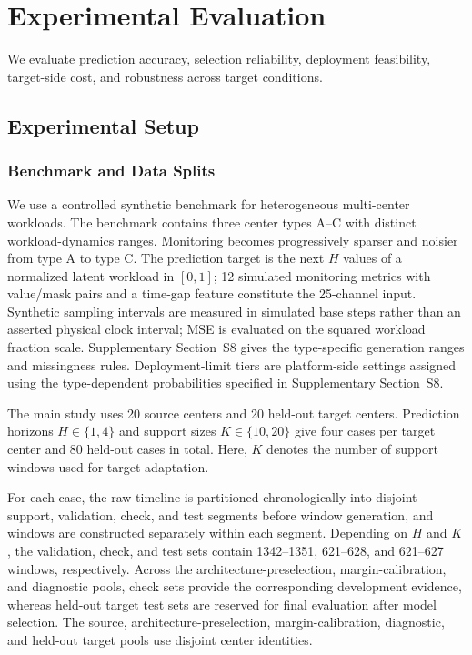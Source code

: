 \documentclass[a4paper,fleqn]{cas-sc}
\begin{document}
\section{Experimental Evaluation}
\label{sec:experiments}

We evaluate prediction accuracy, selection reliability, deployment
feasibility, target-side cost, and robustness across target conditions.

\subsection{Experimental Setup}
\label{subsec:experimental-setup}

\subsubsection{Benchmark and Data Splits}

We use a controlled synthetic benchmark for heterogeneous multi-center
workloads. The benchmark contains three center types A--C with distinct
workload-dynamics ranges. Monitoring becomes progressively sparser and noisier
from type A to type C. The prediction target is the next $H$ values of a
normalized latent workload in $[0,1]$; 12 simulated monitoring metrics
with value/mask pairs and a time-gap feature constitute the 25-channel input.
Synthetic sampling intervals are measured in simulated base steps rather than
an asserted physical clock interval; MSE is evaluated on the squared workload
fraction scale. Supplementary Section~S8 gives the type-specific generation
ranges and missingness rules. Deployment-limit tiers are platform-side settings
assigned using the type-dependent probabilities specified in Supplementary
Section~S8.

The main study uses 20 source centers and 20 held-out target centers.
Prediction horizons $H\in\{1,4\}$ and support sizes $K\in\{10,20\}$ give
four cases per target center and 80 held-out cases in total. Here, $K$
denotes the number of support windows used for target adaptation.

For each case, the raw timeline is partitioned chronologically into disjoint
support, validation, check, and test segments before window generation, and
windows are constructed separately within each segment. Depending on $H$ and
$K$, the validation, check, and test sets contain 1342--1351, 621--628, and
621--627 windows, respectively. Across the architecture-preselection, margin-calibration, and diagnostic pools,
check sets provide the corresponding development evidence, whereas held-out
target test sets are reserved for final evaluation after model selection. The source, architecture-preselection,
margin-calibration, diagnostic, and held-out target pools use disjoint center
identities.
\end{document}
